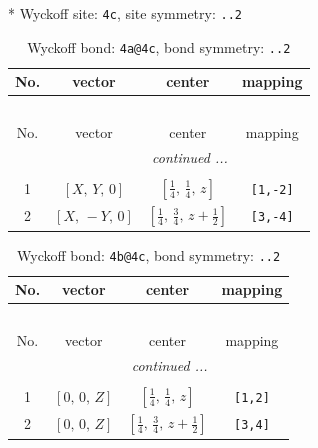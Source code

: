 \documentclass[fleqn,8pt]{jsarticle}
\begin{document}
* Wyckoff site: {\tt 4c}, site symmetry: {\tt ..2}
\renewcommand{\arraystretch}{1.2}
\begin{longtable}{cccc}
\caption{Wyckoff bond: {\tt 4a@4c}, bond symmetry: {\tt ..2}}
 \\
 \hline \hline
No. & vector & center & mapping \\ \hline \endfirsthead

\multicolumn{3}{l}{\tablename\ \thetable{}} \\
 \hline \hline
No. & vector & center & mapping \\ \hline \endhead

 \hline \hline
\multicolumn{3}{r}{\footnotesize\it continued ...} \\ \endfoot

 \hline \hline
\multicolumn{3}{r}{} \\ \endlastfoot

1 & $\left[ X,\, Y,\, 0 \right]$ & $\left[ \frac{1}{4},\, \frac{1}{4},\, z \right]$ & {\tt [1,-2]} \\ \hline
2 & $\left[ X,\, - Y,\, 0 \right]$ & $\left[ \frac{1}{4},\, \frac{3}{4},\, z + \frac{1}{2} \right]$ & {\tt [3,-4]} \\
\end{longtable}
\renewcommand{\arraystretch}{1.2}
\begin{longtable}{cccc}
\caption{Wyckoff bond: {\tt 4b@4c}, bond symmetry: {\tt ..2}}
 \\
 \hline \hline
No. & vector & center & mapping \\ \hline \endfirsthead

\multicolumn{3}{l}{\tablename\ \thetable{}} \\
 \hline \hline
No. & vector & center & mapping \\ \hline \endhead

 \hline \hline
\multicolumn{3}{r}{\footnotesize\it continued ...} \\ \endfoot

 \hline \hline
\multicolumn{3}{r}{} \\ \endlastfoot

1 & $\left[ 0,\, 0,\, Z \right]$ & $\left[ \frac{1}{4},\, \frac{1}{4},\, z \right]$ & {\tt [1,2]} \\ \hline
2 & $\left[ 0,\, 0,\, Z \right]$ & $\left[ \frac{1}{4},\, \frac{3}{4},\, z + \frac{1}{2} \right]$ & {\tt [3,4]} \\
\end{longtable}
\renewcommand{\arraystretch}{1.2}
\end{document}
